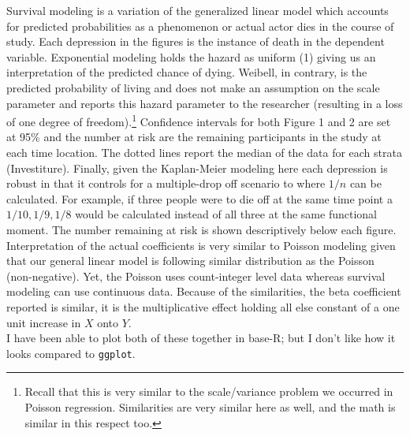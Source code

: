 \documentclass[12pt]{article}\usepackage[]{graphicx}\usepackage[]{color}
\begin{document}
\begin{flushleft}
Survival modeling is a variation of the generalized linear model which accounts for predicted probabilities as a phenomenon or actual actor dies in the course of study. Each depression in the figures is the instance of death in the dependent variable. Exponential modeling holds the hazard as uniform (1) giving us an interpretation of the predicted chance of dying. Weibell, in contrary, is the predicted probability of living and does not make an assumption on the scale parameter and reports this hazard parameter to the researcher (resulting in a loss of one degree of freedom).\footnote{Recall that this is very similar to the scale/variance problem we occurred in Poisson regression. Similarities are very similar here as well, and the math is similar in this respect too.} Confidence intervals for both Figure 1 and 2 are set at 95\% and the number at risk are the remaining participants in the study at each time location. The dotted lines report the median of the data for each strata (Investiture). Finally, given the Kaplan-Meier modeling here each depression is robust in that it controls for a multiple-drop off scenario to where $1/n$ can be calculated. For example, if three people were to die off at the same time point a $1/10, 1/9, 1/8$ would be calculated instead of all three at the same functional moment. The number remaining at risk is shown descriptively below each figure. \\

Interpretation of the actual coefficients is very similar to Poisson modeling given that our general linear model is following similar distribution as the Poisson (non-negative). Yet, the Poisson uses count-integer level data whereas survival modeling can use continuous data. Because of the similarities, the beta coefficient reported is similar, it is the multiplicative effect holding all else constant of a one unit increase in $X$ onto $Y$. \\

I have been able to plot both of these together in base-R; but I don't like how it looks compared to \texttt{ggplot}. \\



\end{flushleft}
\end{document}
